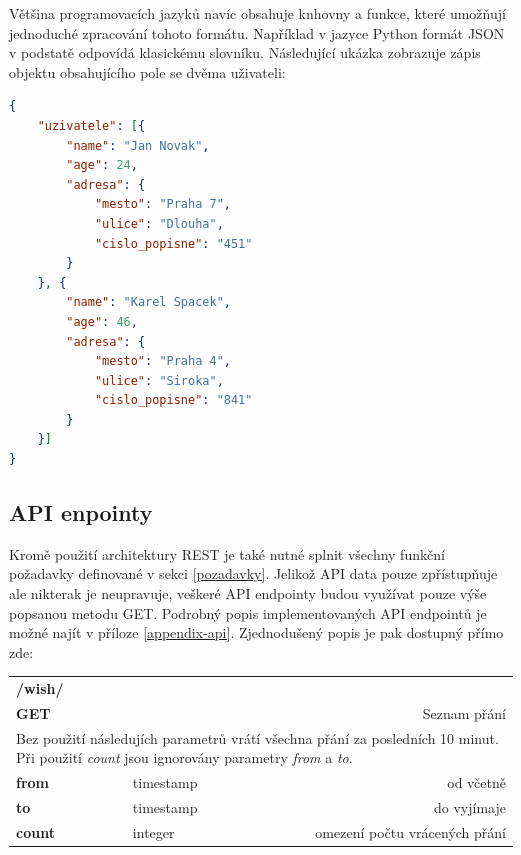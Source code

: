 \documentclass[thesis=B,czech]{FITthesis}[2012/06/26]
\begin{document}
	Většina programovacích jazyků navíc obsahuje knhovny a funkce, které umožňují jednoduché zpracování tohoto formátu. Například v jazyce Python formát JSON v podstatě odpovídá klasickému slovníku. Následující ukázka zobrazuje zápis objektu obsahujícího pole se dvěma uživateli:
\begin{lstlisting}[language=json,firstnumber=1]
{
	"uzivatele": [{
		"name": "Jan Novak",
		"age": 24,
		"adresa": {
			"mesto": "Praha 7",
			"ulice": "Dlouha",
			"cislo_popisne": "451"
		}
	}, {
		"name": "Karel Spacek",
		"age": 46,
		"adresa": {
			"mesto": "Praha 4",
			"ulice": "Siroka",
			"cislo_popisne": "841"
		}
	}]
}
\end{lstlisting}
	
\subsection{API enpointy}
	Kromě použití architektury REST je také nutné splnit všechny funkční požadavky definované v sekci \ref{pozadavky}. Jelikož API data pouze zpřístupňuje ale nikterak je neupravuje, veškeré API endpointy budou využívat pouze výše popsanou metodu GET. Podrobný popis implementovaných API endpointů je možné najít v příloze \ref{appendix-api}. Zjednodušený popis je pak dostupný přímo zde: 
	

\begin{table}[h]
\begin{tabular}{llllr}
\rowcolor[HTML]{EFEFEF}
\large \textbf{/wish/}        &         &                 &        & \multicolumn{1}{l}{}                \\
\rowcolor[HTML]{EFEFEF}
\textbf{GET}          &         &                 &        & Seznam přání                        \\
\multicolumn{5}{l}{\parbox[t]{12.8cm}{Bez použití následujích parametrů vrátí všechna přání za posledních 10 minut. Při použití \textit{count} jsou ignorovány parametry  \textit{from} a \textit{to}.}  } \\
\textbf{from}         &         & timestamp       &        & od včetně                           \\
\textbf{to}           &         & timestamp       &        & do vyjímaje                         \\
\textbf{count}        &         & integer         &        & omezení počtu vrácených přání      \\
\end{tabular}
\end{table}
\end{document}
